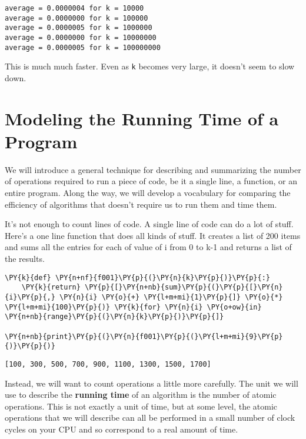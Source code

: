 \begin{Verbatim}
average = 0.0000004 for k = 10000
average = 0.0000000 for k = 100000
average = 0.0000005 for k = 1000000
average = 0.0000000 for k = 10000000
average = 0.0000005 for k = 100000000

\end{Verbatim}


This is much much faster.
Even as \texttt{k} becomes very large, it doesn't seem to slow down.

\section{Modeling the Running Time of a Program}


We will introduce a general technique for describing and summarizing the number of operations required to run a piece of code, be it a single line, a function, or an entire program.
Along the way, we will develop a vocabulary for comparing the efficiency of algorithms that doesn't require us to run them and time them.


It's not enough to count lines of code.
A single line of code can do a lot of stuff.
Here's a one line function that does all kinds of stuff.
It creates a list of 200 items and sums all the entries for each of value of i from 0 to k-1 and returns a list of the results.


\begin{Verbatim}[commandchars=\\\{\}]
\PY{k}{def} \PY{n+nf}{f001}\PY{p}{(}\PY{n}{k}\PY{p}{)}\PY{p}{:}
    \PY{k}{return} \PY{p}{[}\PY{n+nb}{sum}\PY{p}{(}\PY{p}{[}\PY{n}{i}\PY{p}{,} \PY{n}{i} \PY{o}{+} \PY{l+m+mi}{1}\PY{p}{]} \PY{o}{*} \PY{l+m+mi}{100}\PY{p}{)} \PY{k}{for} \PY{n}{i} \PY{o+ow}{in} \PY{n+nb}{range}\PY{p}{(}\PY{n}{k}\PY{p}{)}\PY{p}{]}

\PY{n+nb}{print}\PY{p}{(}\PY{n}{f001}\PY{p}{(}\PY{l+m+mi}{9}\PY{p}{)}\PY{p}{)}
\end{Verbatim}

\begin{Verbatim}
[100, 300, 500, 700, 900, 1100, 1300, 1500, 1700]

\end{Verbatim}


Instead, we will want to count operations a little more carefully.
The unit we will use to describe the \textbf{running time} of an algorithm is the number of atomic operations.
This is not exactly a unit of time, but at some level, the atomic operations that we will describe can all be performed in a small number of clock cycles on your CPU and so correspond to a real amount of time.



